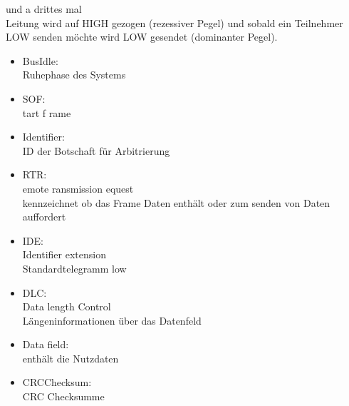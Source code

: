 \documentclass[letterpaper,10pt,english]{jupyterBook}
\begin{document}
\begin{DUlineblock}{0em}
\item[] 
\end{DUlineblock}

\sphinxAtStartPar
und a drittes mal\\
Leitung wird auf HIGH gezogen (rezessiver Pegel)
und sobald ein Teilnehmer LOW senden möchte wird LOW gesendet (dominanter Pegel).

\begin{DUlineblock}{0em}
\item[] 
\end{DUlineblock}

\sphinxAtStartPar
{}
\begin{itemize}
\item {} 
\sphinxAtStartPar
Bus\sphinxhyphen{}Idle:\\
Ruhephase des Systems

\item {} 
\sphinxAtStartPar
SOF:\\
tart f rame

\item {} 
\sphinxAtStartPar
Identifier:\\
ID der Botschaft für Arbitrierung

\item {} 
\sphinxAtStartPar
RTR:\\
emote ransmission equest\\
kennzeichnet ob das Frame Daten enthält oder zum senden von Daten auffordert

\item {} 
\sphinxAtStartPar
IDE:\\
Identifier extension\\
Standardtelegramm low

\item {} 
\sphinxAtStartPar
DLC:\\
Data length Control\\
Längeninformationen über das Datenfeld

\item {} 
\sphinxAtStartPar
Data field:\\
enthält die Nutzdaten

\item {} 
\sphinxAtStartPar
CRC\sphinxhyphen{}Checksum:\\
CRC Checksumme


\end{itemize}
\end{document}
